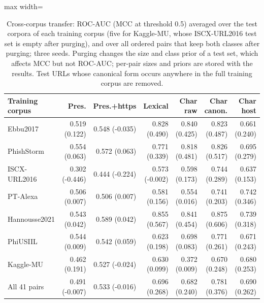 \begin{table}[tp]
\centering
\caption{Cross-corpus transfer: ROC-AUC (MCC at threshold 0.5) averaged over the test corpora of each training corpus (five for Kaggle-MU, whose ISCX-URL2016 test set is empty after purging), and over all ordered pairs that keep both classes after purging; three seeds. Purging changes the size and class prior of a test set, which affects MCC but not ROC-AUC; per-pair sizes and priors are stored with the results. Test URLs whose canonical form occurs anywhere in the full training corpus are removed.}
\label{tab:pair_url}
\footnotesize
\begin{adjustbox}{max width=\linewidth}
\begin{tabular}{@{}lrrrrrr@{}}
\toprule
Training corpus & Pres. & Pres.+https & Lexical & Char raw & Char canon. & Char host \\
\midrule
Ebbu2017 & 0.519 (0.122) & 0.548 (-0.035) & 0.828 (0.490) & 0.840 (0.425) & 0.823 (0.487) & 0.661 (0.240) \\
PhishStorm & 0.554 (0.063) & 0.572 (0.063) & 0.771 (0.339) & 0.818 (0.481) & 0.826 (0.517) & 0.695 (0.279) \\
ISCX-URL2016 & 0.302 (-0.446) & 0.444 (-0.224) & 0.573 (-0.002) & 0.598 (0.173) & 0.744 (0.289) & 0.637 (0.153) \\
PT-Alexa & 0.506 (0.007) & 0.506 (0.007) & 0.581 (0.156) & 0.554 (0.016) & 0.741 (0.203) & 0.742 (0.346) \\
Hannousse2021 & 0.543 (0.042) & 0.589 (0.042) & 0.855 (0.567) & 0.841 (0.454) & 0.875 (0.606) & 0.739 (0.318) \\
PhiUSIIL & 0.544 (0.009) & 0.542 (0.059) & 0.623 (0.198) & 0.698 (0.083) & 0.771 (0.261) & 0.671 (0.243) \\
Kaggle-MU & 0.462 (0.191) & 0.527 (-0.024) & 0.630 (0.099) & 0.372 (0.009) & 0.670 (0.248) & 0.680 (0.253) \\
\midrule
All 41 pairs & 0.491 (-0.007) & 0.533 (-0.016) & 0.696 (0.268) & 0.682 (0.240) & 0.781 (0.376) & 0.690 (0.262) \\
\bottomrule
\end{tabular}
\end{adjustbox}
\end{table}
